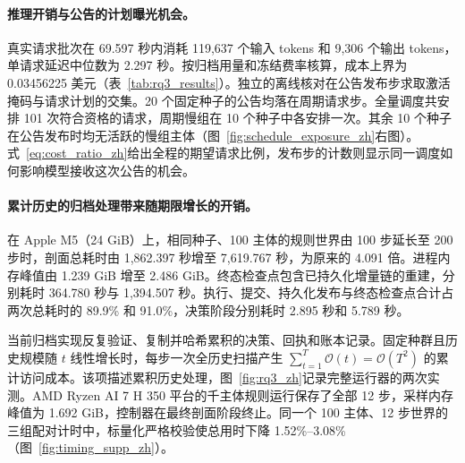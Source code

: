 \paragraph{推理开销与公告的计划曝光机会。}
真实请求批次在 69.597 秒内消耗 119,637 个输入 tokens 和 9,306 个输出 tokens，单请求延迟中位数为 2.297 秒。按归档用量和冻结费率核算，成本上界为 0.03456225 美元（表~\ref{tab:rq3_results}）。独立的离线核对在公告发布步求取激活掩码与请求计划的交集。20 个固定种子的公告均落在周期请求步。全量调度共安排 101 次符合资格的请求，周期慢组在 10 个种子中各安排一次。其余 10 个种子在公告发布时均无活跃的慢组主体（图~\ref{fig:schedule_exposure_zh}右图）。式~\eqref{eq:cost_ratio_zh}给出全程的期望请求比例，发布步的计数则显示同一调度如何影响模型接收这次公告的机会。

\paragraph{累计历史的归档处理带来随期限增长的开销。}
在 Apple M5（24 GiB）上，相同种子、100 主体的规则世界由 100 步延长至 200 步时，剖面总耗时由 1,862.397 秒增至 7,619.767 秒，为原来的 4.091 倍。进程内存峰值由 1.239 GiB 增至 2.486 GiB。终态检查点包含已持久化增量链的重建，分别耗时 364.780 秒与 1,394.507 秒。执行、提交、持久化发布与终态检查点合计占两次总耗时的 89.9\% 和 91.0\%，决策阶段分别耗时 2.895 秒和 5.789 秒。

当前归档实现反复验证、复制并哈希累积的决策、回执和账本记录。固定种群且历史规模随 $t$ 线性增长时，每步一次全历史扫描产生 $\sum_{t=1}^{T}\mathcal{O}(t)=\mathcal{O}(T^2)$ 的累计访问成本。该项描述累积历史处理，图~\ref{fig:rq3_zh}记录完整运行器的两次实测。AMD Ryzen AI 7 H 350 平台的千主体规则运行保存了全部 12 步，采样内存峰值为 1.692 GiB，控制器在最终剖面阶段终止。同一个 100 主体、12 步世界的三组配对计时中，标量化严格校验使总用时下降 1.52\%--3.08\%（图~\ref{fig:timing_supp_zh}）。
